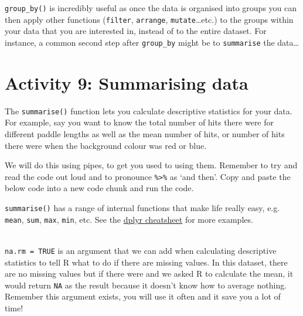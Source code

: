 \documentclass[]{book}
\newenvironment{Shaded}{\begin{snugshade}}{\end{snugshade}}
\newcommand{\CommentTok}[1]{\textcolor[rgb]{0.56,0.35,0.01}{\textit{#1}}}
\newcommand{\DataTypeTok}[1]{\textcolor[rgb]{0.13,0.29,0.53}{#1}}
\newcommand{\KeywordTok}[1]{\textcolor[rgb]{0.13,0.29,0.53}{\textbf{#1}}}
\newcommand{\NormalTok}[1]{#1}
\newcommand{\OperatorTok}[1]{\textcolor[rgb]{0.81,0.36,0.00}{\textbf{#1}}}
\newcommand{\OtherTok}[1]{\textcolor[rgb]{0.56,0.35,0.01}{#1}}
\newcommand{\StringTok}[1]{\textcolor[rgb]{0.31,0.60,0.02}{#1}}
\newenvironment{info}
    {
    \hline\\
    }
    { 
    \\\\\hline
    }
\begin{document}
\texttt{group\_by()} is incredibly useful as once the data is organised into groups you can then apply other functions (\texttt{filter}, \texttt{arrange}, \texttt{mutate}\ldots{}etc.) to the groups within your data that you are interested in, instead of to the entire dataset. For instance, a common second step after \texttt{group\_by} might be to \texttt{summarise} the data\ldots{}

\hypertarget{activity-9-summarising-data}{%
\section{Activity 9: Summarising data}\label{activity-9-summarising-data}}

The \texttt{summarise()} function lets you calculate descriptive statistics for your data. For example, say you want to know the total number of hits there were for different paddle lengths as well as the mean number of hits, or number of hits there were when the background colour was red or blue.

We will do this using pipes, to get you used to using them. Remember to try and read the code out loud and to pronounce \texttt{\%\textgreater{}\%} as `and then'. Copy and paste the below code into a new code chunk and run the code.

\begin{Shaded}
\end{Shaded}

\texttt{summarise()} has a range of internal functions that make life really easy, e.g. \texttt{mean}, \texttt{sum}, \texttt{max}, \texttt{min}, etc. See the \href{https://www.rstudio.com/wp-content/uploads/2015/02/data-wrangling-cheatsheet.pdf}{dplyr cheatsheet} for more examples.

\begin{info}
\texttt{na.rm\ =\ TRUE} is an argument that we can add when calculating
descriptive statistics to tell R what to do if there are missing values.
In this dataset, there are no missing values but if there were and we
asked R to calculate the mean, it would return \texttt{NA} as the result
because it doesn't know how to average nothing. Remember this argument
exists, you will use it often and it save you a lot of time!
\end{info}
\end{document}
